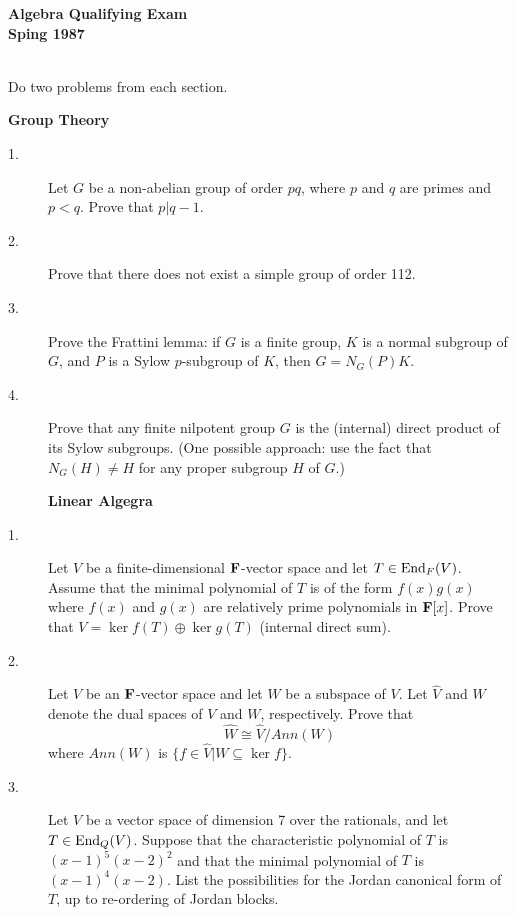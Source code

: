 \documentclass{article}
\begin{document}






\begin{center}\begin{LARGE}
{\bf Algebra Qualifying Exam}\\ 
{\bf Sping 1987}\\ \end{LARGE}
\end{center}
\vspace{0.1in}
\noindent\hrulefill\\

Do two problems from each section.

\centerline{{\bf Group Theory}}

\begin{description}
\item[1.]
Let $G$ be a non-abelian group of order $pq$, where $p$ and $q$ are primes
and $p < q$. Prove that $p|q-1$.

\item[2.]
Prove that there does not exist a simple group of order 112.

\item[3.]
Prove the Frattini lemma: if $G$ is a finite group, $K$ is a normal
subgroup of $G$, and $P$ is a Sylow $p$-subgroup of $K$, then $G = N_G(P)K$.

\item[4.]
Prove that any finite nilpotent group $G$ is the (internal) direct product
of its Sylow subgroups. (One possible approach: use the fact that
$N_G (H) \neq H$ for any proper subgroup $H$ of $G$.)

\centerline{{\bf Linear Algegra}}

\item[1.]
Let $V$ be a finite-dimensional ${\bf F}$-vector space and let
$T \in \hbox{End}_F (V)$. Assume that the minimal polynomial of $T$ is of the
form $f(x) g(x)$ where $f(x)$ and $g(x)$ are relatively prime polynomials
in ${\bf F} [x]$. Prove that $V = \ker f(T) \oplus \ker g(T)$
(internal direct sum).

\item[2.]
Let $V$ be an ${\bf F}$-vector space and let $W$ be a subspace of $V$. Let
$\widehat V$ and $\widehat W$ denote the dual spaces of $V$ and $W$,
respectively. Prove that
$$\widehat W \cong \widehat V / Ann(W)$$
where $Ann(W)$ is $\{f \in \widehat V | W \subseteq  \ker f\}$.

\item[3.]
Let $V$ be a vector space of dimension 7 over the rationals, and let
$T \in \hbox{End}_Q(V)$. Suppose that the characteristic polynomial of $T$
is $(x-1)^5(x-2)^2$ and that the minimal polynomial of $T$ is
$(x-1)^4(x-2)$. List the possibilities for the Jordan canonical form of
$T$, up to re-ordering of Jordan blocks.


\end{description}
\end{document}

